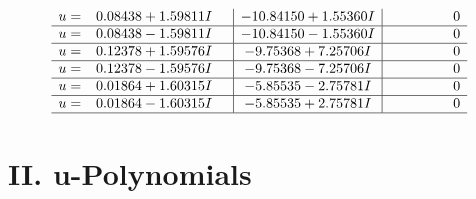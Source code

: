 \documentclass[1p]{elsarticle_modified}
\theoremstyle{definition}
\begin{document}
$$\begin{array}{c|c|c}
\begin{aligned}
u &= \phantom{-}0.08438 + 1.59811 I\end{aligned}
 & -10.84150 + 1.55360 I & \phantom{-0.000000 } 0 \\ \hline\begin{aligned}
u &= \phantom{-}0.08438 - 1.59811 I\end{aligned}
 & -10.84150 - 1.55360 I & \phantom{-0.000000 } 0 \\ \hline\begin{aligned}
u &= \phantom{-}0.12378 + 1.59576 I\end{aligned}
 & -9.75368 + 7.25706 I & \phantom{-0.000000 } 0 \\ \hline\begin{aligned}
u &= \phantom{-}0.12378 - 1.59576 I\end{aligned}
 & -9.75368 - 7.25706 I & \phantom{-0.000000 } 0 \\ \hline\begin{aligned}
u &= \phantom{-}0.01864 + 1.60315 I\end{aligned}
 & -5.85535 - 2.75781 I & \phantom{-0.000000 } 0 \\ \hline\begin{aligned}
u &= \phantom{-}0.01864 - 1.60315 I\end{aligned}
 & -5.85535 + 2.75781 I & \phantom{-0.000000 } 0\\
 \hline 
 \end{array}$$\newpage
\newpage\renewcommand{\arraystretch}{1}
\centering \section*{ II. u-Polynomials}
\end{document}
